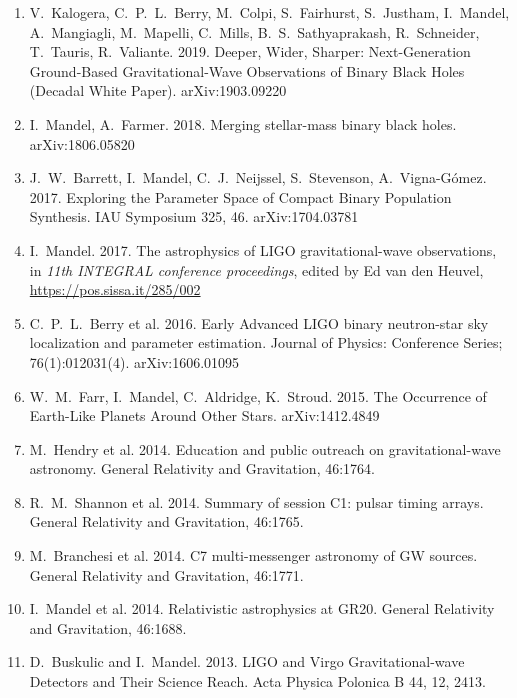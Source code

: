 \documentclass[margin,line]{res}
\begin{document}
\begin{resume}
\begin{enumerate}
\item V.~Kalogera, C.~P.~L.~Berry, M.~Colpi, S.~Fairhurst, S.~Justham, I.~Mandel, A.~Mangiagli, M.~Mapelli, C.~Mills, B.~S.~Sathyaprakash, R.~Schneider, T.~Tauris, R.~Valiante. 2019.  Deeper, Wider, Sharper: Next-Generation Ground-Based Gravitational-Wave Observations of Binary Black Holes (Decadal White Paper).  arXiv:1903.09220 

\item I.~Mandel, A.~Farmer.  2018.  Merging stellar-mass binary black holes.  arXiv:1806.05820

\item J.~W.~Barrett, I.~Mandel, C.~J.~Neijssel, S.~Stevenson, A.~Vigna-G\'{o}mez. 2017. Exploring the Parameter Space of Compact Binary Population Synthesis. IAU Symposium 325, 46. arXiv:1704.03781 

\item I.~Mandel.  2017. The astrophysics of LIGO gravitational-wave observations, in {\it 11th INTEGRAL conference proceedings}, edited by Ed van den Heuvel, \url{https://pos.sissa.it/285/002}

\item C.~P.~L.~Berry et al.  2016.  Early Advanced LIGO binary neutron-star sky localization and parameter estimation.  Journal of Physics: Conference Series; 76(1):012031(4).  arXiv:1606.01095

\item W.~M.~Farr, I.~Mandel, C.~Aldridge, K.~Stroud. 2015. The Occurrence of Earth-Like Planets Around Other Stars.  arXiv:1412.4849
  
\item M.~Hendry et al. 2014. Education and public outreach on gravitational-wave astronomy.  General Relativity and Gravitation, 46:1764.

\item R.~M.~Shannon et al. 2014. Summary of session C1: pulsar timing arrays. General Relativity and Gravitation, 46:1765.

\item M.~Branchesi et al. 2014.  C7 multi-messenger astronomy of GW sources.
General Relativity and Gravitation, 46:1771.

\item I.~Mandel et al.  2014.  Relativistic astrophysics at GR20.  General Relativity and Gravitation, 46:1688.

\item D.~Buskulic and I.~Mandel.  2013.  LIGO and Virgo Gravitational-wave Detectors and Their Science Reach.  Acta Physica Polonica B 44, 12, 2413.


\end{enumerate}
\end{resume}
\end{document}
